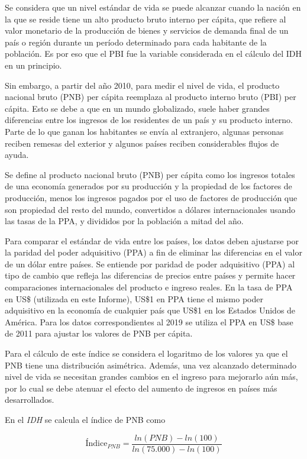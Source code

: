 \documentclass[
  10pt,
]{article}
\begin{document}
Se considera que un nivel estándar de vida se puede alcanzar cuando la
nación en la que se reside tiene un alto producto bruto interno per
cápita, que refiere al valor monetario de la producción de bienes y
servicios de demanda final de un país o región durante un período
determinado para cada habitante de la población. Es por eso que el PBI
fue la variable considerada en el cálculo del IDH en un principio.

Sin embargo, a partir del año 2010, para medir el nivel de vida, el
producto nacional bruto (PNB) per cápita reemplaza al producto interno
bruto (PBI) per cápita. Esto se debe a que en un mundo globalizado,
suele haber grandes diferencias entre los ingresos de los residentes de
un país y su producto interno. Parte de lo que ganan los habitantes se
envía al extranjero, algunas personas reciben remesas del exterior y
algunos países reciben considerables flujos de ayuda.

Se define al producto nacional bruto (PNB) per cápita como los ingresos
totales de una economía generados por su producción y la propiedad de
los factores de producción, menos los ingresos pagados por el uso de
factores de producción que son propiedad del resto del mundo,
convertidos a dólares internacionales usando las tasas de la PPA, y
divididos por la población a mitad del año.

Para comparar el estándar de vida entre los países, los datos deben
ajustarse por la paridad del poder adquisitivo (PPA) a fin de eliminar
las diferencias en el valor de un dólar entre países. Se entiende por
paridad de poder adquisitivo (PPA) al tipo de cambio que refleja las
diferencias de precios entre países y permite hacer comparaciones
internacionales del producto e ingreso reales. En la tasa de PPA en US\$
(utilizada en este Informe), US\$1 en PPA tiene el mismo poder
adquisitivo en la economía de cualquier país que US\$1 en los Estados
Unidos de América. Para los datos correspondientes al 2019 se utiliza el
PPA en US\$ base de 2011 para ajustar los valores de PNB per cápita.

Para el cálculo de este índice se considera el logaritmo de los valores
ya que el PNB tiene una distribución asimétrica. Además, una vez
alcanzado determinado nivel de vida se necesitan grandes cambios en el
ingreso para mejorarlo aún más, por lo cual se debe atenuar el efecto
del aumento de ingresos en países más desarrollados.

En el \emph{IDH} se calcula el índice de PNB como

\[\text{Índice}_{PNB} = \frac{ln(PNB) - ln(100)}{ln(75.000)-ln(100)}\]
\end{document}
